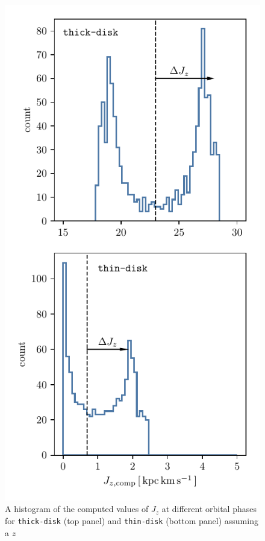 \documentclass[twocolumn]{aastex62}
\newcommand{\thin}{\texttt{thin-disk}}
\newcommand{\thick}{\texttt{thick-disk}}
\begin{document}
\begin{figure}
\begin{center}
\includegraphics[width=\columnwidth]{fig/schmactions_Jz_zerr_hist.pdf}
\end{center}
\caption{A histogram of the computed values of $J_z$ at different orbital
phases for \thick{} (top panel) and \thin{} (bottom panel) assuming a $z$
}
\end{figure}
\end{document}
